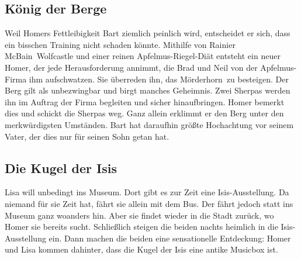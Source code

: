 \subsection{König der Berge}\label{5F16}
Weil Homers Fettleibigkeit Bart ziemlich peinlich wird, entscheidet er sich, dass ein bisschen Training nicht schaden könnte. Mithilfe von Rainier \glqq McBain\grqq\ Wolfcastle und einer reinen Apfelmus-Riegel-Diät entsteht ein neuer Homer, der jede Herausforderung annimmt, die Brad und Neil von der Apfelmus-Firma ihm aufschwatzen. Sie überreden ihn, das \glqq Mörderhorn\grqq\ zu besteigen. Der Berg gilt als unbezwingbar und birgt manches Geheimnis. Zwei Sherpas werden ihn im Auftrag der Firma begleiten und sicher hinaufbringen. Homer bemerkt dies und schickt die Sherpas weg. Ganz allein erklimmt er den Berg unter den merkwürdigsten Umständen. Bart hat daraufhin größte Hochachtung vor seinem Vater, der dies nur für seinen Sohn getan hat.

	
	
\subsection{Die Kugel der Isis}\label{5F17}
Lisa will unbedingt ins Museum. Dort gibt es zur Zeit eine Isis-Ausstellung. Da niemand für sie Zeit hat, fährt sie allein mit dem Bus. Der fährt jedoch statt ins Museum ganz woanders hin. Aber sie findet wieder in die Stadt zurück, wo Homer sie bereits sucht. Schließlich steigen die beiden nachts heimlich in die Isis-Ausstellung ein. Dann machen die beiden eine sensationelle Entdeckung: Homer und Lisa kommen dahinter, dass die Kugel der Isis eine antike Musicbox ist.

